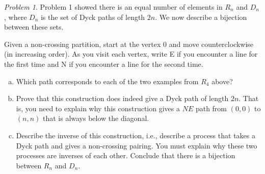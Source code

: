 \documentclass[11pt,twoside]{amsart}
\theoremstyle{plain}
\theoremstyle{remark}
\newtheorem{prob}{Problem}
\theoremstyle{definition}
\theoremstyle{definition}
\begin{document}
\begin{prob}
Problem 1 showed there is an equal number of elements in $R_n$ and $D_n$, where $D_n$ is the set of Dyck paths of length $2n$. We now describe a bijection between these sets.

 Given a non-crossing partition, start at the vertex 0 and move counterclockwise (in increasing order). As you visit each vertex, write E if you encounter a line for the first time and N if you encounter a line for the second time.
\begin{enumerate}[(a)]
 \item Which path corresponds to each of the two examples from $R_4$ above?
 \item Prove that this construction does indeed give a Dyck path of length $2n$. That is, you need to explain why this construction gives a $NE$ path from $(0,0)$ to $(n,n)$ that is always below the diagonal.
 \item Describe the inverse of this construction, i.e., describe a process that takes a Dyck path and gives a non-crossing pairing. You must explain why these two processes are inverses of each other. Conclude that there is a bijection between $R_n$ and $D_n$.
\end{enumerate}
\end{prob}
\end{document}
